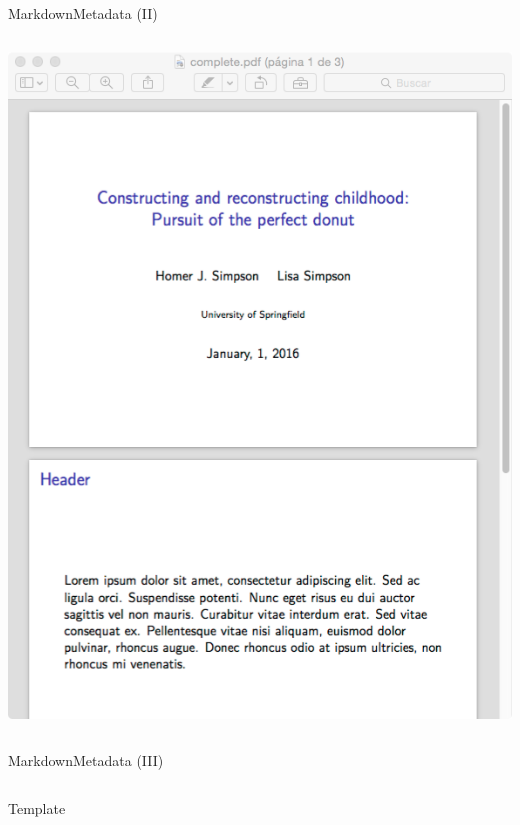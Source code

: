 \documentclass{beamer}
\begin{document}
\begin{frame}{Markdown}{Metadata (II)}
\begin{columns}
     \column{0.31\dimexpr\paperwidth-10pt}
		\centering \includegraphics[width=\linewidth]{figs/metadataBeamer.png} 
\end{columns}
\end{frame}


\begin{frame}[fragile]{Markdown}{Metadata (III)}
 \begin{columns}
	\begin{exampleblock}{Template}
	
	\end{exampleblock}
 \end{columns}
\end{frame}


\end{document}
